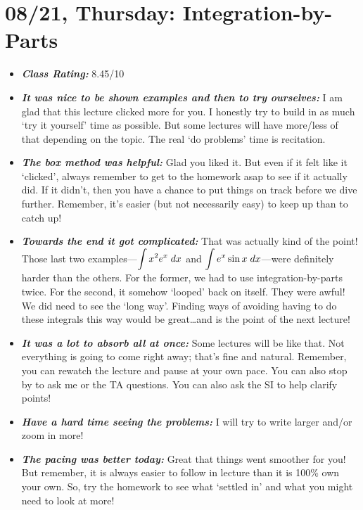 \documentclass[11pt,letterpaper]{article}
\begin{document}
\newpage
\section*{08/21, Thursday: Integration-by-Parts\label{08-21}}

\begin{itemize}
\item {\bfseries\itshape Class Rating:} 8.45/10

\item {\bfseries\itshape It was nice to be shown examples and then to try ourselves:} I am glad that this lecture clicked more for you. I honestly try to build in as much `try it yourself' time as possible. But some lectures will have more/less of that depending on the topic. The real `do problems' time is recitation. 

\item {\bfseries\itshape The box method was helpful:} Glad you liked it. But even if it felt like it `clicked', always remember to get to the homework asap to see if it actually did. If it didn't, then you have a chance to put things on track before we dive further. Remember, it's easier (but not necessarily easy) to keep up than to catch up!

\item {\bfseries\itshape Towards the end it got complicated:} That was actually kind of the point! Those last two examples---$\displaystyle\int x^2 e^x \;dx$ and $\displaystyle\int e^x \sin x \;dx$---were definitely harder than the others. For the former, we had to use integration-by-parts twice. For the second, it somehow `looped' back on itself. They were awful! We did need to see the `long way'. Finding ways of avoiding having to do these integrals this way would be great\dots and is the point of the next lecture! 

\item {\bfseries\itshape It was a lot to absorb all at once:} Some lectures will be like that. Not everything is going to come right away; that's fine and natural. Remember, you can rewatch the lecture and pause at your own pace. You can also stop by to ask me or the TA questions. You can also ask the SI to help clarify points!

\item {\bfseries\itshape Have a hard time seeing the problems:} I will try to write larger and/or zoom in more!

\item {\bfseries\itshape The pacing was better today:} Great that things went smoother for you! But remember, it is always easier to follow in lecture than it is 100\% own your own. So, try the homework to see what `settled in' and what you might need to look at more!


\end{itemize}
\end{document}

